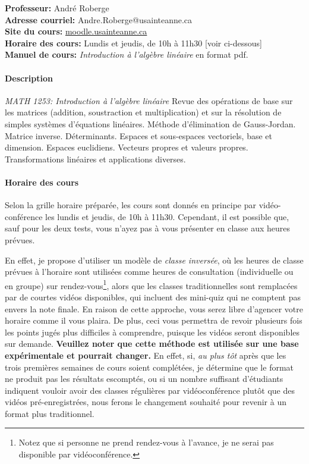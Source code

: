 \documentclass[11pt]{article}
\begin{document}
\noindent\textbf{Professeur: } André Roberge \\
\textbf{Adresse courriel: } Andre.Roberge@usainteanne.ca\\
\textbf{Site du cours: } \url{moodle.usainteanne.ca} \\
\textbf{Horaire des cours:} Lundis et jeudis, de 10h à 11h30 {\tiny [voir ci-dessous]} \\
\textbf{Manuel de cours:} \textit{Introduction à l'algèbre linéaire} en format pdf.

\paragraph*{Description} 

{\small
\textit{MATH 1253: Introduction à l'algèbre linéaire}
Revue des opérations de base sur les matrices (addition, soustraction et multiplication) et sur la résolution de simples systèmes d'équations linéaires.  Méthode d'élimination de Gauss-Jordan.  Matrice inverse. Déterminants. Espaces et sous-espaces vectoriels, base et dimension.  Espaces euclidiens. Vecteurs propres et valeurs propres.  Transformations linéaires et applications diverses.
}

\paragraph*{Horaire des cours} Selon la grille horaire préparée, les cours sont donnés en principe 
par vidéo-conférence les lundis et jeudis, de 10h à 11h30.  Cependant, il est possible que, sauf pour
les deux tests, vous n'ayez pas à vous présenter en classe aux heures prévues.

En effet, je propose d'utiliser un modèle de \textit{classe inversée}, où les heures de classe prévues à
l'horaire sont utilisées comme heures de consultation (individuelle ou en groupe) sur rendez-vous\footnote{Notez que si personne ne prend rendez-vous à l'avance, je ne serai pas disponible par vidéoconférence.
}, alors
que les classes traditionnelles sont remplacées par de courtes vidéos disponibles,
qui incluent des mini-quiz qui ne comptent pas envers la note finale.   En raison de cette approche,
vous serez libre d'agencer votre horaire comme il vous plaira.  De plus, ceci vous permettra de revoir
plusieurs fois les points jugés plus difficiles à comprendre, puisque les vidéos seront disponibles sur demande.
\textbf{Veuillez noter que cette méthode est utilisée sur une base expérimentale et pourrait changer.} En effet, si, \textit{au plus tôt} après que les
trois premières semaines de cours soient complétées, je détermine que le format ne produit pas les résultats escomptés, ou si un nombre
suffisant d'étudiants indiquent vouloir avoir des classes régulières par vidéoconférence plutôt que des vidéos
pré-enregistrées, nous ferons le changement souhaité pour revenir à un format plus traditionnel.  
\end{document}
